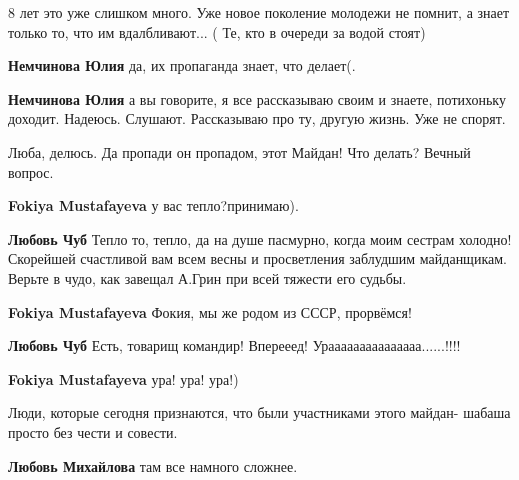 \begin{itemize}
8 лет это уже слишком много. Уже новое поколение молодежи не помнит, а знает
только то, что им вдалбливают... ( Те, кто в очереди за водой стоят)

\begin{itemize} %
\textbf{Немчинова Юлия} да, их пропаганда знает, что делает(.

\textbf{Немчинова Юлия} а вы говорите, я все рассказываю своим и знаете, потихоньку доходит. Надеюсь. Слушают. Рассказываю про ту, другую жизнь. Уже не спорят.
\end{itemize} %

Люба, делюсь.
Да пропади он пропадом,
этот Майдан!
Что делать?
Вечный вопрос.

\begin{itemize} %
\textbf{Fokiya Mustafayeva} у вас тепло?принимаю).

\textbf{Любовь Чуб} Тепло то, тепло, да на душе пасмурно, когда моим сестрам холодно!
Скорейшей счастливой вам всем весны и просветления заблудшим майданщикам.
Верьте в чудо, как завещал А.Грин при всей тяжести его судьбы.

\textbf{Fokiya Mustafayeva} Фокия, мы же родом из СССР, прорвёмся!

\textbf{Любовь Чуб}
Есть, товарищ командир!
Вперееед! Урааааааааааааааа......!!!!

\textbf{Fokiya Mustafayeva} ура! ура! ура!)
\end{itemize} %


Люди, которые сегодня признаются, что были участниками этого майдан- шабаша
просто без чести и совести.

\textbf{Любовь Михайлова} там все намного сложнее.


\end{itemize} %
